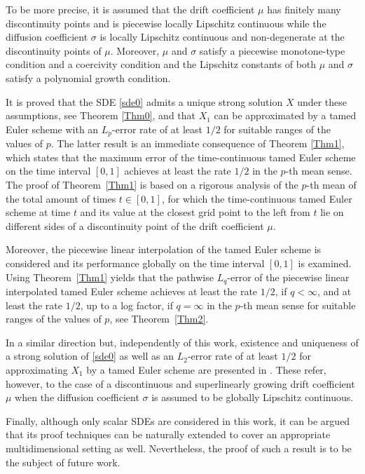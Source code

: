 \documentclass[11pt]{amsart}
\theoremstyle{plain}
\theoremstyle{definition}
\begin{document}
To be more precise,   it is assumed   that the drift  coefficient $\mu$ has  finitely many discontinuity points and is  piecewise locally Lipschitz continuous while the diffusion coefficient $\sigma$ is  locally Lipschitz continuous   and  non-degenerate at the discontinuity points of $\mu$.  Moreover, $\mu$ and $\sigma$ satisfy a piecewise monotone-type condition and a coercivity condition and the Lipschitz constants of both $\mu$ and $\sigma$
satisfy a polynomial growth condition.

It is proved  that
  the SDE \eqref{sde0} admits a unique strong solution $X$ under these assumptions,
 see Theorem \ref{Thm0},
  and that
 $X_1$ can be approximated by a tamed Euler scheme with an $L_p$-error rate of at least $1/2$ for suitable ranges of the values of $p$.
 The latter result
 is an immediate consequence of  Theorem \ref{Thm1}, which states that  the maximum error of the time-continuous tamed Euler scheme on the time interval $[0,1]$
achieves at least the rate
$1/2$  in
the
$p$-th mean sense.
The proof of Theorem~\ref{Thm1} is based on a rigorous analysis of the
$p$-th mean of the total amount of times
$t\in[0,1]$, for which the  time-continuous tamed Euler scheme at time $t$ and its value at the closest grid point to the left from $t$ lie on different sides of a discontinuity point of the drift coefficient $\mu$.

 Moreover,  the piecewise linear interpolation of the tamed Euler scheme is considered
and its performance
 globally on the time interval $[0,1]$  is examined.  Using Theorem~\ref{Thm1}  yields that
the pathwise $L_q$-error of the piecewise linear interpolated  tamed Euler scheme
achieves at least the rate $1/2$,  if $q<\infty$, and at least the rate $1/2$, up to a log factor,  if $q=\infty$ in the $p$-th mean sense for suitable ranges of the values of $p$, see
 Theorem~\ref{Thm2}.

 In a similar direction but, independently of this work,
  existence and uniqueness of a strong solution of \eqref{sde0} as well as an $L_2$-error rate of at least $1/2$ for approximating $X_1$ by a tamed Euler scheme are presented in  \cite{SS22}. These refer, however, to  the case of a discontinuous and superlinearly growing drift coefficient $\mu$  when the diffusion coefficient $\sigma$ is assumed to be globally Lipschitz continuous.

Finally, although only scalar SDEs are considered in this work, it can be argued that its proof techniques can be naturally   extended to cover an appropriate multidimensional setting as well. Nevertheless, the proof of
such a result is to be the subject of future work.
\end{document}
